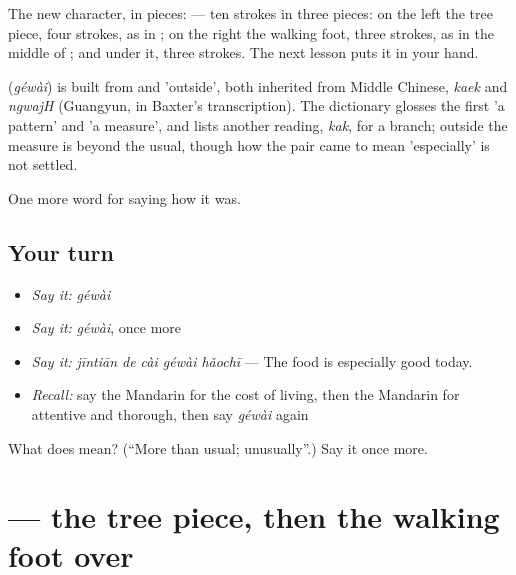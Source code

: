 The new character, in pieces:  — ten strokes in three pieces: on the left the tree piece, four strokes, as in ; on the right the walking foot, three strokes, as in the middle of ; and  under it, three strokes. The next lesson puts it in your hand.

\begin{cousinweb}
\textbf{} (\emph{géwài}) is built from  and  'outside', both inherited from Middle Chinese, \emph{kaek} and \emph{ngwajH} (Guangyun, in Baxter's transcription). The dictionary glosses the first 'a pattern' and 'a measure', and lists another reading, \emph{kak}, for a branch; outside the measure is beyond the usual, though how the pair came to mean 'especially' is not settled.
\end{cousinweb}

\begin{grammarlens}[title={What you've built}]
One more word for saying how it was.
\end{grammarlens}

\subsection*{Your turn}
\begin{itemize}
\raggedright
  \item \emph{Say it:} \emph{géwài}
  \item \emph{Say it:} \emph{géwài}, once more
  \item \emph{Say it:} \emph{jīntiān de cài géwài hǎochī} — The food is especially good today.
  \item \emph{Recall:} say the Mandarin for the cost of living, then the Mandarin for attentive and thorough, then say \emph{géwài} again
\end{itemize}

\begin{tcolorbox}[breakable,colback=teal!4,colframe=teal!35!black,title={Before you move on}]
What does  mean? (\textquotedblleft{}More than usual; unusually\textquotedblright{}.) Say it once more.
\end{tcolorbox}
\section[\texorpdfstring{\zh{格} (gé)}{格 (gé)}]{ — the tree piece, then the walking foot over }

\label{lesson:ZH-W525-ge-pattern}



